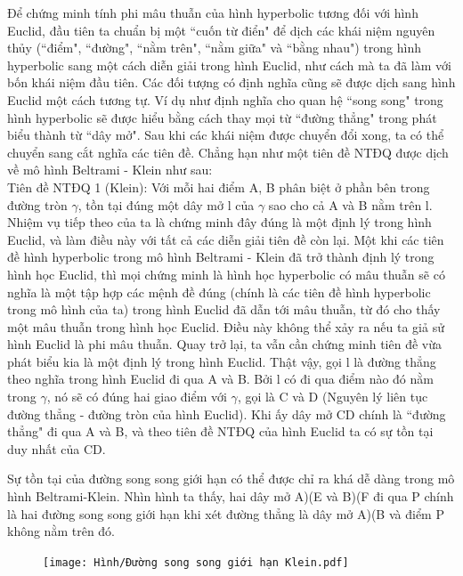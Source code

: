 \begin{multicols}{2}
	
	Để chứng minh tính phi mâu thuẫn của hình hyperbolic tương đối với hình Euclid, đầu tiên ta chuẩn bị một ``cuốn từ điển" để dịch các khái niệm nguyên thủy (``điểm", ``đường", ``nằm trên", ``nằm giữa" và ``bằng nhau") trong hình hyperbolic sang một cách diễn giải trong hình Euclid, như cách mà ta đã làm với bốn khái niệm đầu tiên. Các đối tượng có định nghĩa cũng sẽ được dịch sang hình Euclid một cách tương tự. Ví dụ như định nghĩa cho quan hệ ``song song" trong hình hyperbolic sẽ được hiểu bằng cách thay mọi từ ``đường thẳng" trong phát biểu thành từ ``dây mở". Sau khi các khái niệm được chuyển đổi xong, ta có thể chuyển sang cắt nghĩa các tiên đề. Chẳng hạn như một tiên đề NTĐQ được dịch về mô hình Beltrami - Klein như sau:\\
	Tiên đề NTĐQ 1 (Klein): Với mỗi hai điểm A, B phân biệt ở phần bên trong đường tròn $\gamma$, tồn tại đúng một dây mở l của $\gamma$ sao cho cả A và B nằm trên l. \\
	
	Nhiệm vụ tiếp theo của ta là chứng minh đây đúng là một định lý trong hình Euclid, và làm điều này với tất cả các diễn giải tiên đề còn lại. Một khi các tiên đề hình hyperbolic trong mô hình Beltrami - Klein đã trở thành định lý trong hình học Euclid, thì mọi chứng minh là hình học hyperbolic có mâu thuẫn sẽ có nghĩa là một tập hợp các mệnh đề đúng (chính là các tiên đề hình hyperbolic trong mô hình của ta) trong hình Euclid đã dẫn tới mâu thuẫn, từ đó cho thấy một mâu thuẫn trong hình học Euclid. Điều này không thể xảy ra nếu ta giả sử hình Euclid là phi mâu thuẫn.
	Quay trở lại, ta vẫn cần chứng minh tiên đề vừa phát biểu kia là một định lý trong hình Euclid.
	Thật vậy, gọi l là đường thẳng theo nghĩa trong hình Euclid đi qua A và B. Bởi l có đi qua điểm nào đó nằm trong $\gamma$, nó sẽ có đúng hai giao điểm với $\gamma$, gọi là C và D (Nguyên lý liên tục đường thẳng - đường tròn của hình Euclid). Khi ấy dây mở CD chính là ``đường thẳng" đi qua A và B, và theo tiên đề NTĐQ của hình Euclid ta có sự tồn tại duy nhất của CD.
	
	Sự tồn tại của  đường song song giới hạn có thể được chỉ ra khá dễ dàng trong mô hình Beltrami-Klein. Nhìn hình ta thấy, hai dây mở A)(E và B)(F đi qua P chính là hai đường song song giới hạn khi xét đường thẳng là dây mở A)(B và điểm P không nằm trên đó.
	
	\begin{figure}[ht]
		\texttt{[image: Hình/Đường song song giới hạn Klein.pdf]}
	\end{figure}
	

\end{multicols}
